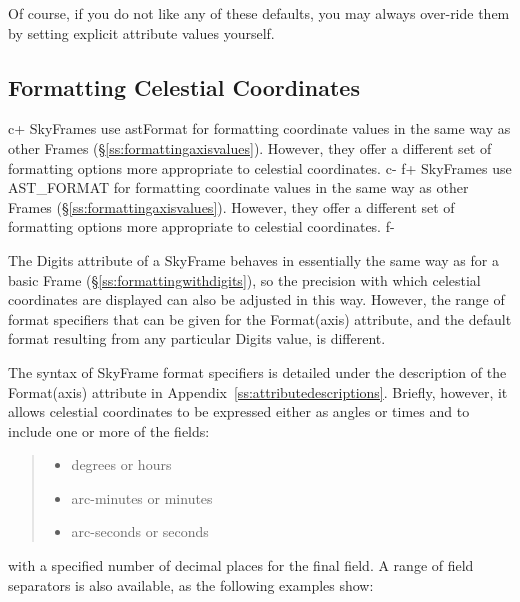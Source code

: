 \documentclass[twoside,11pt]{starlink}
\providecommand{\appref}[1]{Appendix~\ref{#1}}
\providecommand{\secref}[1]{\S\ref{#1}}
\begin{document}
Of course, if you do not like any of these defaults, you may always
over-ride them by setting explicit attribute values yourself.

\subsection{\label{ss:formattingskyaxisvalues}Formatting Celestial Coordinates}

c+
SkyFrames use astFormat for formatting coordinate values in the same
way as other Frames (\secref{ss:formattingaxisvalues}). However, they
offer a different set of formatting options more appropriate to
celestial coordinates.
c-
f+
SkyFrames use AST\_FORMAT for formatting coordinate values in the same
way as other Frames (\secref{ss:formattingaxisvalues}). However, they
offer a different set of formatting options more appropriate to
celestial coordinates.
f-

The Digits attribute of a SkyFrame behaves in essentially the same way
as for a basic Frame (\secref{ss:formattingwithdigits}), so the
precision with which celestial coordinates are displayed can also be
adjusted in this way. However, the range of format specifiers that can
be given for the Format(axis) attribute, and the default format
resulting from any particular Digits value, is different.

The syntax of SkyFrame format specifiers is detailed under the
description of the Format(axis) attribute in
\appref{ss:attributedescriptions}.  Briefly, however, it allows
celestial coordinates to be expressed either as angles or times and to
include one or more of the fields:

\begin{quote}
\begin{itemize}
\item degrees or hours
\item arc-minutes or minutes
\item arc-seconds or seconds
\end{itemize}
\end{quote}

with a specified number of decimal places for the final field. A range
of field separators is also available, as the following examples show:
\end{document}
